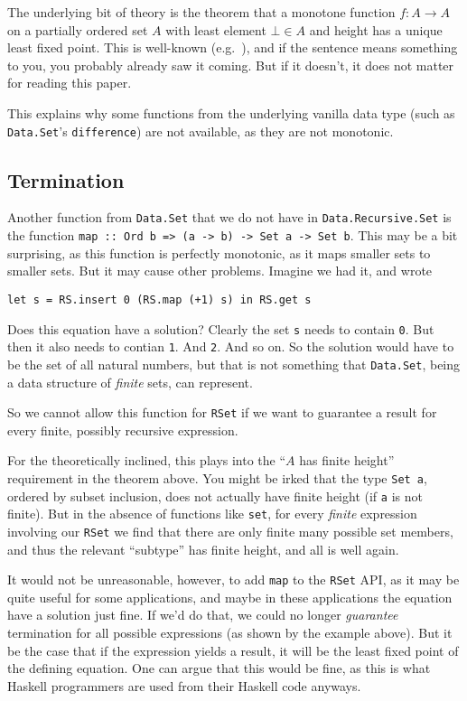 \documentclass[manuscript,screen,acmsmall]{acmart}
\begin{document}
The underlying bit of theory is the theorem that a monotone function $f : A \to A$ on a partially ordered set $A$ with least element $\bot \in A$ and height has a unique least fixed point. This is well-known (e.g.\ \citet{lazyleast}), and if the sentence means something to you, you probably already saw it coming. But if it doesn't, it does not matter for reading this paper.

This explains why some functions from the underlying vanilla data type (such as \verb|Data.Set|'s \verb|difference|) are not available, as they are not monotonic.

\subsection{Termination}

Another function from \verb|Data.Set| that we do not have in \verb|Data.Recursive.Set| is the function \verb|map :: Ord b => (a -> b) -> Set a -> Set b|. This may be a bit surprising, as this function is perfectly monotonic, as it maps smaller sets to smaller sets. But it may cause other problems. Imagine we had it, and wrote
\begin{verbatim}
let s = RS.insert 0 (RS.map (+1) s) in RS.get s
\end{verbatim}
Does this equation have a solution? Clearly the set \verb|s| needs to contain \verb|0|. But then it also needs to contian \verb|1|. And \verb|2|. And so on. So the solution would have to be the set of all natural numbers, but that is not something that \verb|Data.Set|, being a data structure of \emph{finite} sets, can represent.

So we cannot allow this function for \verb|RSet| if we want to guarantee a result for every finite, possibly recursive expression.

For the theoretically inclined, this plays into the “$A$ has finite height” requirement in the theorem above. You might be irked that the type \verb|Set a|, ordered by subset inclusion, does not actually have finite height (if \verb|a| is not finite). But in the absence of functions like \verb|set|, for every \emph{finite} expression involving our \verb|RSet| we find that there are only finite many possible set members, and thus the relevant “subtype” has finite height, and all is well again.

It would not be unreasonable, however, to add \verb|map| to the \verb|RSet| API, as it may be quite useful for some applications, and maybe in these applications the equation have a solution just fine. If we'd do that, we could no longer \emph{guarantee} termination for all possible expressions (as shown by the example above). But it be the case that if the expression yields a result, it will be the least fixed point of the defining equation. One can argue that this would be fine, as this is what Haskell programmers are used from their Haskell code anyways.
\end{document}
